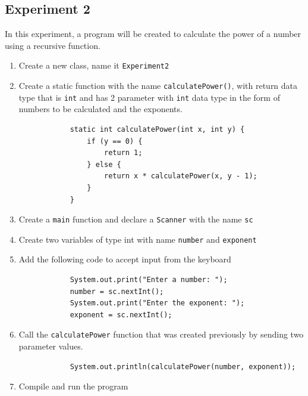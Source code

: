\documentclass[12pt,titlepage]{article}
\begin{document}
\subsection{Experiment 2}
In this experiment, a program will be created to calculate the power of a number using a recursive function.
\begin{enumerate}
    \item Create a new class, name it \texttt{Experiment2}
    \item {
        Create a static function with the name \texttt{calculatePower()}, with return data type
        that is \texttt{int} and has 2 parameter with \texttt{int} data type in the form of numbers to be
        calculated and the exponents.

        \begin{verbatim}
            static int calculatePower(int x, int y) {
                if (y == 0) {
                    return 1;
                } else {
                    return x * calculatePower(x, y - 1);
                }
            }
        \end{verbatim}
    }
    \item Create a \texttt{main} function and declare a \texttt{Scanner} with the name \texttt{sc}
    \item Create two variables of type int with name \texttt{number} and \texttt{exponent}
    \item {
        Add the following code to accept input from the keyboard
        \begin{verbatim}
            System.out.print("Enter a number: ");
            number = sc.nextInt();
            System.out.print("Enter the exponent: ");
            exponent = sc.nextInt();
        \end{verbatim}
    }
    \item {
        Call the \texttt{calculatePower} function that was created previously by sending two parameter values.
        \begin{verbatim}
            System.out.println(calculatePower(number, exponent));
        \end{verbatim}
    }
    \pagebreak
    \item {
        Compile and run the program

}
\end{enumerate}
\end{document}
